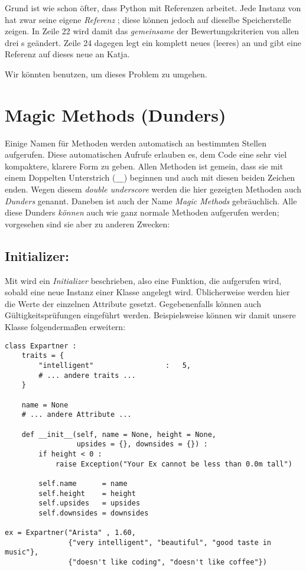 Grund ist wie schon öfter, dass Python mit Referenzen arbeitet. Jede Instanz von  hat zwar seine eigene \emph{Referenz} ; diese können jedoch auf dieselbe Speicherstelle zeigen. In Zeile 22 wird damit das \emph{gemeinsame}  der Bewertungskriterien von allen drei s geändert. Zeile 24 dagegen legt ein komplett neues (leeres)  an und gibt eine Referenz auf dieses neue  an Katja.

Wir könnten  benutzen, um dieses Problem zu umgehen.

\section{Magic Methods (Dunders)}
Einige Namen für Methoden werden automatisch an bestimmten Stellen aufgerufen. Diese automatischen Aufrufe erlauben es, dem Code eine sehr viel kompaktere, klarere Form zu geben. Allen Methoden ist gemein, dass sie mit einem Doppelten Unterstrich (\texttt{\_\_}) beginnen und auch mit diesen beiden Zeichen enden. Wegen diesem \emph{double underscore} werden die hier gezeigten Methoden auch \emph{Dunders} genannt. Daneben ist auch der Name \emph{Magic Methods} gebräuchlich. Alle diese Dunders \emph{können} auch wie ganz normale Methoden aufgerufen werden; vorgesehen sind sie aber zu anderen Zwecken:

\subsection{Initializer: }
Mit  wird ein \emph{Initializer} beschrieben, also eine Funktion, die aufgerufen wird, sobald eine neue Instanz einer Klasse angelegt wird. Üblicherweise werden hier die Werte der einzelnen Attribute gesetzt. Gegebenenfalls können auch Gültigkeitsprüfungen eingeführt werden. Beispielsweise können wir damit unsere Klasse folgendermaßen erweitern:

\begin{codebox}
\begin{verbatim}
class Expartner :
    traits = {
        "intelligent"                 :   5,
        # ... andere traits ...
    }
    
    name = None
    # ... andere Attribute ...
    
    def __init__(self, name = None, height = None,
                 upsides = {}, downsides = {}) :
        if height < 0 :
            raise Exception("Your Ex cannot be less than 0.0m tall")
        
        self.name      = name
        self.height    = height
        self.upsides   = upsides
        self.downsides = downsides
    
ex = Expartner("Arista" , 1.60, 
               {"very intelligent", "beautiful", "good taste in music"},
               {"doesn't like coding", "doesn't like coffee"})
\end{verbatim}
\end{codebox}

